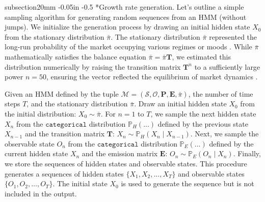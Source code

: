 \documentclass[12pt, letterpaper]{article}
\makeatletter
\renewcommand\subsection{\@startsection
	{subsection}{2}{0mm}
	{-0.05in}
	{-0.5\baselineskip}
	{\normalfont\normalsize\bfseries}}
\makeatother
\begin{document}
\subsection*{Growth rate generation.}
Let's outline a simple sampling algorithm for generating random sequences from an HMM (without jumps). We initialize the generation process by drawing an initial hidden state $X_0$ from the stationary distribution $\bar{\pi}$. The stationary distribution $\bar{\pi}$ represented the long-run probability of the market occupying various regimes or moods \cite{hamilton_regime_2018}. While $\bar{\pi}$ mathematically satisfies the balance equation $\bar{\pi} = \bar{\pi}\mathbf{T}$, we estimated this distribution numerically by raising the transition matrix $\mathbf{T}^n$ to a sufficiently large power $n = 50$, ensuring the vector reflected the equilibrium of market dynamics \cite{grinstead_introduction_1997}.

Given an HMM defined by the tuple $\mathcal{M} = (\mathcal{S},\mathcal{O},\mathbf{P},\mathbf{E}, \bar{\pi})$, the number of time steps $T$, and the stationary distribution $\bar{\pi}$. Draw an initial hidden state $X_0$ from the initial distribution: $X_0\sim \bar{\pi}$. For $n = 1$ to $T$, we sample the next hidden state $X_n$ from the $\texttt{categorical}$ distribution $\mathbb{P}_{H}(...)$ defined by the previous state $X_{n-1}$ and the transition matrix $\mathbf{T}$: $X_n \sim \mathbb{P}_{H}(X_n \mid X_{n-1})$. Next, we sample the observable state $O_n$ from the $\texttt{categorical}$ distribution $\mathbb{P}_{E}(...)$ defined by the current hidden state $X_n$ and the emission matrix $\mathbf{E}$: $O_n \sim \mathbb{P}_{E}(O_n \mid X_n)$. Finally, we store the sequences of hidden states and observable states. This procedure generates a sequences of hidden states $\{X_1, X_2, \ldots, X_T\}$ and observable states $\{O_1, O_2, \ldots, O_T\}$. The initial state $X_0$ is used to generate the sequence but is not included in the output.


\clearpage
\end{document}
